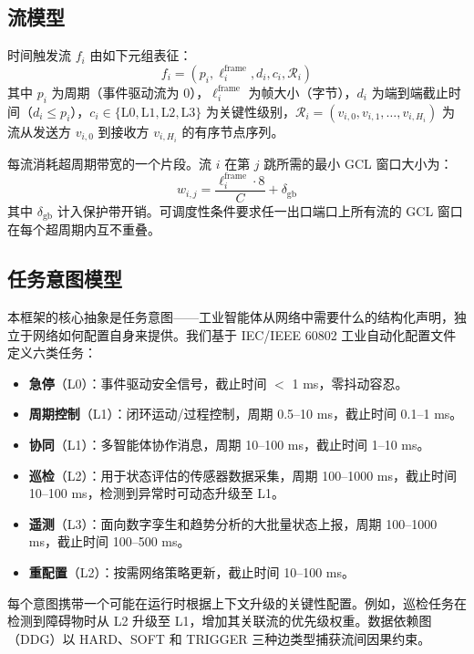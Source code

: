 \documentclass[UTF8]{ctexart}
\begin{document}
\subsection{流模型}

时间触发流 $f_i$ 由如下元组表征：
\begin{equation}
f_i = (p_i, \ell_i^{\text{frame}}, d_i, c_i, \mathcal{R}_i)
\end{equation}
其中 $p_i$ 为周期（事件驱动流为 0），$\ell_i^{\text{frame}}$ 为帧大小（字节），$d_i$ 为端到端截止时间（$d_i \leq p_i$），$c_i \in \{\text{L0}, \text{L1}, \text{L2}, \text{L3}\}$ 为关键性级别，$\mathcal{R}_i = (v_{i,0}, v_{i,1}, \ldots, v_{i,H_i})$ 为流从发送方 $v_{i,0}$ 到接收方 $v_{i,H_i}$ 的有序节点序列。

每流消耗超周期带宽的一个片段。流 $i$ 在第 $j$ 跳所需的最小 GCL 窗口大小为：
\begin{equation}
w_{i,j} = \frac{\ell_i^{\text{frame}} \cdot 8}{C} + \delta_{\text{gb}}
\end{equation}
其中 $\delta_{\text{gb}}$ 计入保护带开销。可调度性条件要求任一出口端口上所有流的 GCL 窗口在每个超周期内互不重叠。

\subsection{任务意图模型}

本框架的核心抽象是任务意图——工业智能体从网络中需要什么的结构化声明，独立于网络如何配置自身来提供。我们基于 IEC/IEEE 60802 工业自动化配置文件定义六类任务：

\begin{itemize}
\item \textbf{急停}（L0）：事件驱动安全信号，截止时间 $<$ 1 ms，零抖动容忍。
\item \textbf{周期控制}（L1）：闭环运动/过程控制，周期 0.5--10 ms，截止时间 0.1--1 ms。
\item \textbf{协同}（L1）：多智能体协作消息，周期 10--100 ms，截止时间 1--10 ms。
\item \textbf{巡检}（L2）：用于状态评估的传感器数据采集，周期 100--1000 ms，截止时间 10--100 ms，检测到异常时可动态升级至 L1。
\item \textbf{遥测}（L3）：面向数字孪生和趋势分析的大批量状态上报，周期 100--1000 ms，截止时间 100--500 ms。
\item \textbf{重配置}（L2）：按需网络策略更新，截止时间 10--100 ms。
\end{itemize}

每个意图携带一个可能在运行时根据上下文升级的关键性配置。例如，巡检任务在检测到障碍物时从 L2 升级至 L1，增加其关联流的优先级权重。数据依赖图（DDG）以 HARD、SOFT 和 TRIGGER 三种边类型捕获流间因果约束。
\end{document}
